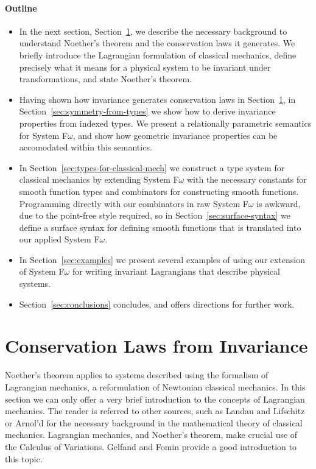 \documentclass{sigplanconf}
\theoremstyle{examplestyle}
\begin{document}
\paragraph{Outline}

\begin{itemize}
\item In the next section,
  Section~\ref{sec:conservation-laws-from-symmetry}, we describe the
  necessary background to understand Noether's theorem and the
  conservation laws it generates. We briefly introduce the Lagrangian
  formulation of classical mechanics, define precisely what it means
  for a physical system to be invariant under transformations, and
  state Noether's theorem.
\item Having shown how invariance generates conservation laws in
  Section~\ref{sec:conservation-laws-from-symmetry}, in
  Section~\ref{sec:symmetry-from-types} we show how to derive
  invariance properties from indexed types. We present a relationally
  parametric semantics for System F$\omega$, and show how geometric
  invariance properties can be accomodated within this semantics.
\item In Section~\ref{sec:types-for-classical-mech} we construct a
  type system for classical mechanics by extending System F$\omega$
  with the necessary constants for smooth function types and
  combinators for constructing smooth functions. Programming directly
  with our combinators in raw System F$\omega$ is awkward, due to the
  point-free style required, so in Section~\ref{sec:surface-syntax} we
  define a surface syntax for defining smooth functions that is
  translated into our applied System F$\omega$.
\item In Section~\ref{sec:examples} we present several examples of
  using our extension of System F$\omega$ for writing invariant
  Lagrangians that describe physical systems.
\item Section~\ref{sec:conclusions} concludes, and offers directions
  for further work.
\end{itemize}

\section{Conservation Laws from Invariance}
\label{sec:conservation-laws-from-symmetry}

Noether's theorem applies to systems described using the formalism of
Lagrangian mechanics, a reformulation of Newtonian classical
mechanics. In this section we can only offer a very brief introduction
to the concepts of Lagrangian mechanics. The reader is referred to
other sources, such as Landau and Lifschitz \cite{landau60mechanics}
or Arnol'd \cite{arnold89mathematical} for the necessary background in
the mathematical theory of classical mechanics. Lagrangian mechanics,
and Noether's theorem, make crucial use of the Calculus of
Variations. Gelfand and Fomin \cite{gelfand00calculus} provide a good
introduction to this topic.
\end{document}
